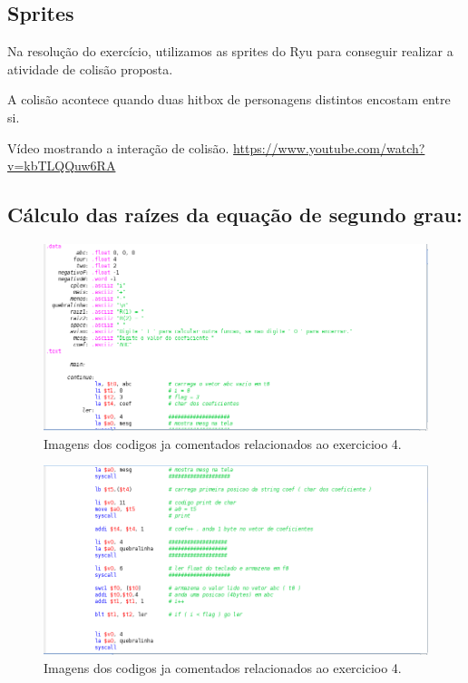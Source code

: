 \documentclass[12pt]{article}
\begin{document}
\subsection{Sprites}
\label{subsec:sprites}
	Na resolução do exercício, utilizamos as sprites do Ryu para conseguir realizar a atividade de colisão proposta.

	A colisão acontece quando duas hitbox de personagens distintos encostam entre si.

	Vídeo mostrando a interação de colisão. \url{https://www.youtube.com/watch?v=kbTLQQuw6RA}


\subsection{ Cálculo das raízes da equação de segundo grau:}
\label{subsec:sprites}

\begin{figure}[H]
	\centering
	\includegraphics[width=1\textwidth]{EX_4_1.png}
	\caption{Imagens dos codigos ja comentados relacionados ao exercicioo 4.}
\end{figure}

\begin{figure}[H]
	\centering
	\includegraphics[width=1\textwidth]{EX_4_2.png}
	\caption{Imagens dos codigos ja comentados relacionados ao exercicioo 4.}
	\label{fig:hilo}
\end{figure}
\end{document}
